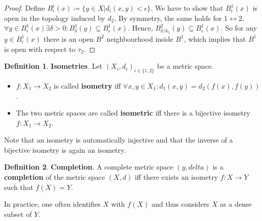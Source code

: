 \documentclass[10pt,a4paper]{article}
\theoremstyle{definition}
\newtheorem{definition}{Definition}
\theoremstyle{cor}
\theoremstyle{theorem}
\theoremstyle{lemma}
\theoremstyle{example}
\begin{document}
\begin{proof}
Define $B_{\epsilon}^{i}(x) \coloneq \{ y\in X | d_i(x, y) < \epsilon\}$. We have to show that $B_{\epsilon}^{1}(x)$ is open in the topology induced by $d_2$. By symmetry, the same holds for $1\leftrightarrow 2$. $\forall y \in B_{\epsilon}^{1}(x) \exists \delta > 0 : B_{\delta}^{1}(y) \subseteq B_{\epsilon}^{1}(x)$. Hence, $B_{\delta/k_1}^{2}(y) \subseteq B_{\epsilon}^{1}(x)$. So for any $y\in B_{\epsilon}^{1}(x)$ there is an open $B^{2}$ neighbourhood inside $B^{1}$, which implies that $B^{1}$ is open with respect to $\tau_2$.
\end{proof}

\begin{definition}
\textbf{Isometries}. Let $(X_i, d_i)_{i \in \{1,2\}}$ be a metric space.
\begin{itemize}
\item $f: X_1 \rightarrow X_2$ is called \textbf{isometry} iff $\forall x,y\in X_1: d_1(x, y) = d_2(f(x), f(y))$.
\item The two metric spaces are called \textbf{isometric} iff there is a bijective isometry $f: X_1 \rightarrow X_2$.
\end{itemize}
\end{definition}
\noindent Note that an isometry is automatically injective and that the inverse of a bijective isometry is again an isometry.
\begin{definition} 
\textbf{Completion}. A complete metric space $(y, delta)$ is a \textbf{completion} of the metric space $(X, d)$ iff there exists an isometry $f: X\rightarrow Y$ such that $\overline{f(X)} = Y $.
\end{definition}
\noindent In practice, one often identifies $X$ with $f(X)$ and thus considers $X$ as a dense subset of $Y$.
\end{document}
